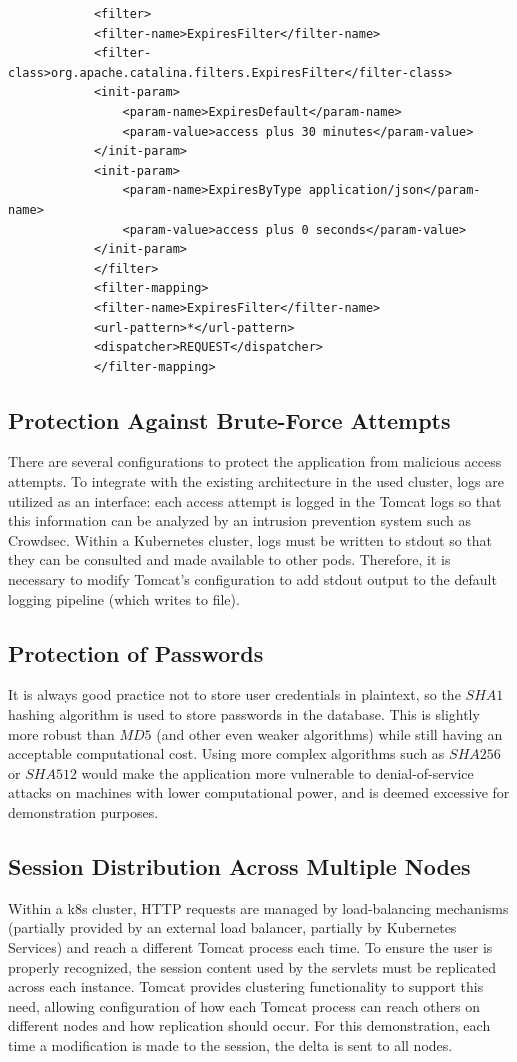 \documentclass[12pt, a4paper, renqo, final]{amsart}
\begin{document}
		\begin{lstlisting}
		    <filter>
			<filter-name>ExpiresFilter</filter-name>
			<filter-class>org.apache.catalina.filters.ExpiresFilter</filter-class>
			<init-param>
			    <param-name>ExpiresDefault</param-name>
			    <param-value>access plus 30 minutes</param-value>
			</init-param>
			<init-param>
			    <param-name>ExpiresByType application/json</param-name>
			    <param-value>access plus 0 seconds</param-value>
			</init-param>
		    </filter>
		    <filter-mapping>
			<filter-name>ExpiresFilter</filter-name>
			<url-pattern>*</url-pattern>
			<dispatcher>REQUEST</dispatcher>
		    </filter-mapping>
		\end{lstlisting}

		\subsection{Protection Against Brute-Force Attempts}
		There are several configurations to protect the application from malicious access attempts. To integrate with the existing architecture in the used cluster, logs are utilized as an interface: each access attempt is logged in the Tomcat logs so that this information can be analyzed by an intrusion prevention system such as Crowdsec. Within a Kubernetes cluster, logs must be written to stdout so that they can be consulted and made available to other pods. Therefore, it is necessary to modify Tomcat's configuration to add stdout output to the default logging pipeline (which writes to file).

		\subsection{Protection of Passwords}
		It is always good practice not to store user credentials in plaintext, so the $SHA1$ hashing algorithm is used to store passwords in the database. This is slightly more robust than $MD5$ (and other even weaker algorithms) while still having an acceptable computational cost. Using more complex algorithms such as $SHA256$ or $SHA512$ would make the application more vulnerable to denial-of-service attacks on machines with lower computational power, and is deemed excessive for demonstration purposes.

		\subsection{Session Distribution Across Multiple Nodes}
		Within a k8s cluster, HTTP requests are managed by load-balancing mechanisms (partially provided by an external load balancer, partially by Kubernetes Services) and reach a different Tomcat process each time. To ensure the user is properly recognized, the session content used by the servlets must be replicated across each instance. Tomcat provides clustering functionality to support this need, allowing configuration of how each Tomcat process can reach others on different nodes and how replication should occur. For this demonstration, each time a modification is made to the session, the delta is sent to all nodes.
\end{document}
